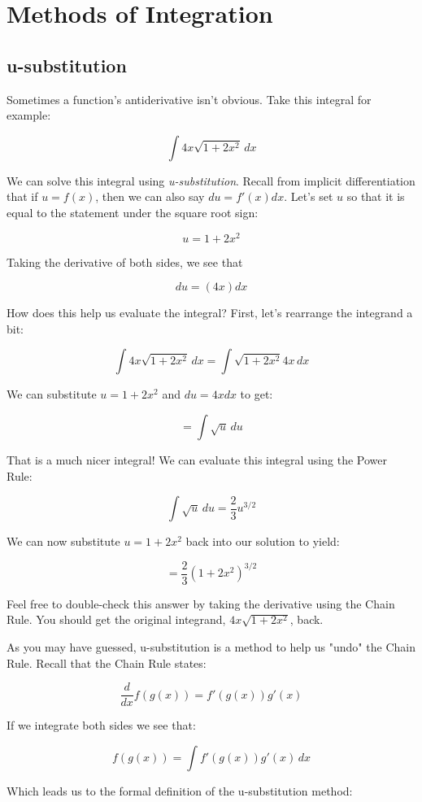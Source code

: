 \chapter{Methods of Integration}

\section{u-substitution}
Sometimes a function's antiderivative isn't obvious. Take this 
integral for example: 

$$\int 4x \sqrt{1 + 2x^2}\, dx$$

We can solve this integral using \textit{u-substitution}. Recall from implicit 
differentiation that if $u = f(x)$, then we can also say $du = f'(x) dx$. 
Let's set $u$ so that it is equal to the statement under the square root sign: 

$$u = 1 + 2x^2$$

Taking the derivative of both sides, we see that 

$$du = (4x) dx$$ 

How does this help us evaluate the integral? First, let's rearrange the 
integrand a bit: 

$$\int 4x \sqrt{1 + 2x^2}\,dx = \int \sqrt{1 + 2x^2} 4x\,dx$$

We can substitute $u = 1 + 2x^2$ and $du = 4x dx$ to get: 

$$= \int \sqrt{u}\,du$$

That is a much nicer integral! We can evaluate this integral using the Power 
Rule: 

$$\int \sqrt{u}\,du = \frac{2}{3}u^{3/2}$$

We can now substitute $u = 1 + 2x^2$ back into our solution to yield: 

$$= \frac{2}{3}(1 + 2x^2)^{3/2}$$

Feel free to double-check this answer by taking the derivative using the 
Chain Rule. You should get the original integrand, $4x \sqrt{1 + 2x^2}$, back. 

As you may have guessed, u-substitution is a method to help us "undo" the 
Chain Rule. Recall that the Chain Rule states: 

$$\frac{d}{dx}f(g(x)) = f'(g(x))g'(x)$$

If we integrate both sides we see that: 

$$f(g(x)) = \int f'(g(x))g'(x)\,dx$$ 

Which leads us to the formal definition of the u-substitution method:

